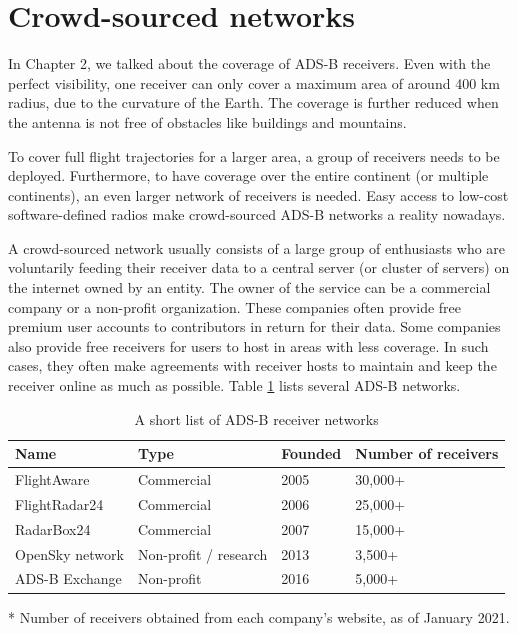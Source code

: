 \section{Crowd-sourced networks}

In Chapter 2, we talked about the coverage of ADS-B receivers. Even with the perfect visibility, one receiver can only cover a maximum area of around 400 km radius, due to the curvature of the Earth. The coverage is further reduced when the antenna is not free of obstacles like buildings and mountains. 

To cover full flight trajectories for a larger area, a group of receivers needs to be deployed. Furthermore, to have coverage over the entire continent (or multiple continents), an even larger network of receivers is needed. Easy access to low-cost software-defined radios make crowd-sourced ADS-B networks a reality nowadays.

A crowd-sourced network usually consists of a large group of enthusiasts who are voluntarily feeding their receiver data to a central server (or cluster of servers) on the internet owned by an entity. The owner of the service can be a commercial company or a non-profit organization. These companies often provide free premium user accounts to contributors in return for their data. Some companies also provide free receivers for users to host in areas with less coverage. In such cases, they often make agreements with receiver hosts to maintain and keep the receiver online as much as possible. Table \ref{tb:adsb_networks} lists several ADS-B networks.

\begin{table}[ht]
\caption{A short list of ADS-B receiver networks}
\label{tb:adsb_networks}
\begin{threeparttable}
\begin{tabular}{|l|l|l|l|}
\hline
\textbf{Name} & \textbf{Type} & \textbf{Founded} & \textbf{Number of receivers} \\ \hline
FlightAware & Commercial & 2005 & 30,000+\tnote{*} \\ \hline
FlightRadar24 & Commercial & 2006 & 25,000+\tnote{*} \\ \hline
RadarBox24 & Commercial & 2007 & 15,000+ \\ \hline
OpenSky network & Non-profit / research & 2013 & 3,500+\tnote{*} \\ \hline
ADS-B Exchange & Non-profit & 2016 & 5,000+\tnote{*} \\ \hline
\end{tabular}
\begin{tablenotes}
\item[*] Number of receivers obtained from each company's website, as of January 2021.
\end{tablenotes}
\end{threeparttable}    
\end{table}

